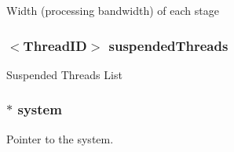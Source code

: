 \label{classInOrderCPU_a60be67c646e9cf5778b1eb73436194dc}
Width (processing bandwidth) of each stage \hypertarget{classInOrderCPU_adee15257888edfe2927ee23593ff44bb}{
\subsubsection[{suspendedThreads}]{$<${\bf ThreadID}$>$ {\bf suspendedThreads}}}
\label{classInOrderCPU_adee15257888edfe2927ee23593ff44bb}
Suspended Threads List \hypertarget{classInOrderCPU_af27ccd765f13a4b7bd119dc7579e2746}{
\subsubsection[{system}]{$\ast$ {\bf system}}}
\label{classInOrderCPU_af27ccd765f13a4b7bd119dc7579e2746}
Pointer to the system. 

